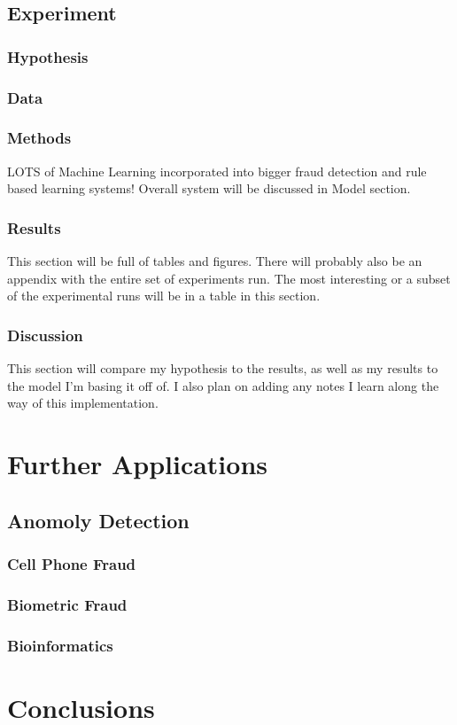 \documentclass[midd]{thesis}
\begin{document}
\section{Experiment}

\subsection{Hypothesis}

\subsection{Data}

\subsection{Methods}

LOTS of Machine Learning incorporated into bigger fraud detection and rule based learning systems! Overall system will be discussed in Model section.

\subsection{Results}

This section will be full of tables and figures. There will probably also be an appendix with the entire set of experiments run. The most interesting or a subset of the experimental runs will be in a table in this section.

\subsection{Discussion}

This section will compare my hypothesis to the results, as well as my results to the model I'm basing it off of. I also plan on adding any notes I learn along the way of this implementation.
\pagebreak
\chapter{Further Applications}


\section{Anomoly Detection}

\subsection{Cell Phone Fraud}

\subsection{Biometric Fraud}

\subsection{Bioinformatics}

\pagebreak
\chapter{Conclusions}




\end{document}
